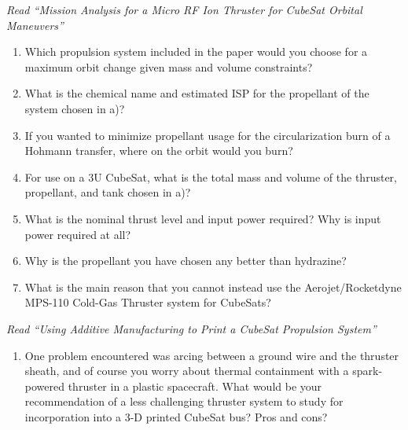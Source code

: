 \documentclass[onecolumn,10pt]{jhwhw}
\begin{document}
\problem{}
\textit{Read ``Mission Analysis for a Micro RF Ion Thruster for CubeSat Orbital Maneuvers''}
\begin{enumerate}
\item Which propulsion system included in the paper would you choose for a maximum orbit change given mass and volume constraints?
\item What is the chemical name and estimated ISP for the propellant of the system chosen in a)?
\item If you wanted to minimize propellant usage for the circularization burn of a Hohmann transfer, where on the orbit would you burn?
\item For use on a 3U CubeSat, what is the total mass and volume of the thruster, propellant, and tank chosen in a)?
\item What is the nominal thrust level and input power required? Why is input power required at all?
\item Why is the propellant you have chosen any better than hydrazine?
\item What is the main reason that you cannot instead use the Aerojet/Rocketdyne MPS-110 Cold-Gas Thruster system for CubeSats?
\end{enumerate}

\problem{}
\textit{Read ``Using Additive Manufacturing to Print a CubeSat Propulsion System''}
\begin{enumerate}
\item One problem encountered was arcing between a ground wire and the thruster sheath, and of course you worry about thermal containment with a spark-powered thruster in a plastic spacecraft. What would be your recommendation of a less challenging thruster system to study for incorporation into a 3-D printed CubeSat bus? Pros and cons?
\end{enumerate}
\end{document}
